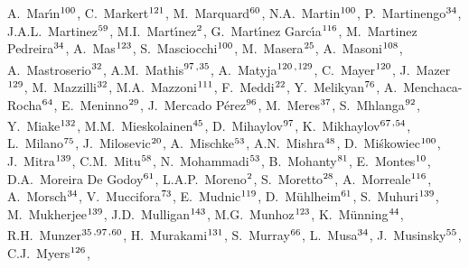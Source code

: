 \begin{flushleft}
A.~Mar\'{\i}n$^\textrm{\scriptsize 100}$,
C.~Markert$^\textrm{\scriptsize 121}$,
M.~Marquard$^\textrm{\scriptsize 60}$,
N.A.~Martin$^\textrm{\scriptsize 100}$,
P.~Martinengo$^\textrm{\scriptsize 34}$,
J.A.L.~Martinez$^\textrm{\scriptsize 59}$,
M.I.~Mart\'{\i}nez$^\textrm{\scriptsize 2}$,
G.~Mart\'{\i}nez Garc\'{\i}a$^\textrm{\scriptsize 116}$,
M.~Martinez Pedreira$^\textrm{\scriptsize 34}$,
A.~Mas$^\textrm{\scriptsize 123}$,
S.~Masciocchi$^\textrm{\scriptsize 100}$,
M.~Masera$^\textrm{\scriptsize 25}$,
A.~Masoni$^\textrm{\scriptsize 108}$,
A.~Mastroserio$^\textrm{\scriptsize 32}$,
A.M.~Mathis$^\textrm{\scriptsize 97}$\textsuperscript{,}$^\textrm{\scriptsize 35}$,
A.~Matyja$^\textrm{\scriptsize 120}$\textsuperscript{,}$^\textrm{\scriptsize 129}$,
C.~Mayer$^\textrm{\scriptsize 120}$,
J.~Mazer$^\textrm{\scriptsize 129}$,
M.~Mazzilli$^\textrm{\scriptsize 32}$,
M.A.~Mazzoni$^\textrm{\scriptsize 111}$,
F.~Meddi$^\textrm{\scriptsize 22}$,
Y.~Melikyan$^\textrm{\scriptsize 76}$,
A.~Menchaca-Rocha$^\textrm{\scriptsize 64}$,
E.~Meninno$^\textrm{\scriptsize 29}$,
J.~Mercado P\'erez$^\textrm{\scriptsize 96}$,
M.~Meres$^\textrm{\scriptsize 37}$,
S.~Mhlanga$^\textrm{\scriptsize 92}$,
Y.~Miake$^\textrm{\scriptsize 132}$,
M.M.~Mieskolainen$^\textrm{\scriptsize 45}$,
D.~Mihaylov$^\textrm{\scriptsize 97}$,
K.~Mikhaylov$^\textrm{\scriptsize 67}$\textsuperscript{,}$^\textrm{\scriptsize 54}$,
L.~Milano$^\textrm{\scriptsize 75}$,
J.~Milosevic$^\textrm{\scriptsize 20}$,
A.~Mischke$^\textrm{\scriptsize 53}$,
A.N.~Mishra$^\textrm{\scriptsize 48}$,
D.~Mi\'{s}kowiec$^\textrm{\scriptsize 100}$,
J.~Mitra$^\textrm{\scriptsize 139}$,
C.M.~Mitu$^\textrm{\scriptsize 58}$,
N.~Mohammadi$^\textrm{\scriptsize 53}$,
B.~Mohanty$^\textrm{\scriptsize 81}$,
E.~Montes$^\textrm{\scriptsize 10}$,
D.A.~Moreira De Godoy$^\textrm{\scriptsize 61}$,
L.A.P.~Moreno$^\textrm{\scriptsize 2}$,
S.~Moretto$^\textrm{\scriptsize 28}$,
A.~Morreale$^\textrm{\scriptsize 116}$,
A.~Morsch$^\textrm{\scriptsize 34}$,
V.~Muccifora$^\textrm{\scriptsize 73}$,
E.~Mudnic$^\textrm{\scriptsize 119}$,
D.~M{\"u}hlheim$^\textrm{\scriptsize 61}$,
S.~Muhuri$^\textrm{\scriptsize 139}$,
M.~Mukherjee$^\textrm{\scriptsize 139}$,
J.D.~Mulligan$^\textrm{\scriptsize 143}$,
M.G.~Munhoz$^\textrm{\scriptsize 123}$,
K.~M\"{u}nning$^\textrm{\scriptsize 44}$,
R.H.~Munzer$^\textrm{\scriptsize 35}$\textsuperscript{,}$^\textrm{\scriptsize 97}$\textsuperscript{,}$^\textrm{\scriptsize 60}$,
H.~Murakami$^\textrm{\scriptsize 131}$,
S.~Murray$^\textrm{\scriptsize 66}$,
L.~Musa$^\textrm{\scriptsize 34}$,
J.~Musinsky$^\textrm{\scriptsize 55}$,
C.J.~Myers$^\textrm{\scriptsize 126}$,

\end{flushleft}
